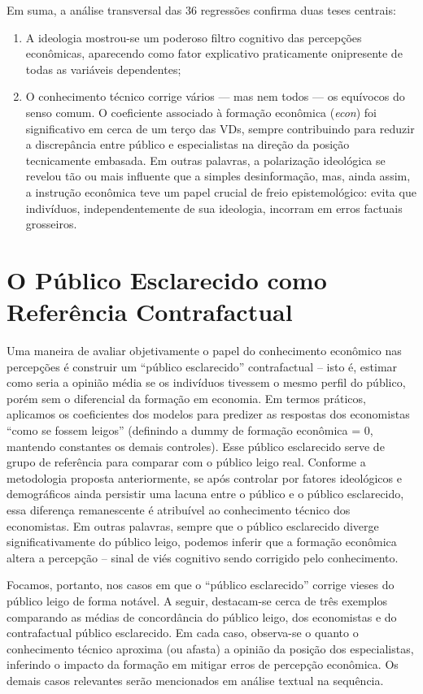 Em suma, a análise transversal das 36 regressões confirma duas teses centrais: 

\begin{enumerate}
    \item A ideologia mostrou-se um poderoso filtro cognitivo das percepções econômicas, aparecendo como fator explicativo praticamente onipresente de todas as variáveis dependentes;
    \item O conhecimento técnico corrige vários — mas nem todos — os equívocos do senso comum. O coeficiente associado à formação econômica (\emph{econ}) foi significativo em cerca de um terço das VDs, sempre contribuindo para reduzir a discrepância entre público e especialistas na direção da posição tecnicamente embasada. Em outras palavras, a polarização ideológica se revelou tão ou mais influente que a simples desinformação, mas, ainda assim, a instrução econômica teve um papel crucial de freio epistemológico: evita que indivíduos, independentemente de sua ideologia, incorram em erros factuais grosseiros.
\end{enumerate}

\section{O Público Esclarecido como Referência Contrafactual}

Uma maneira de avaliar objetivamente o papel do conhecimento econômico nas percepções é construir um “público esclarecido” contrafactual – isto é, estimar como seria a opinião média se os indivíduos tivessem o mesmo perfil do público, porém sem o diferencial da formação em economia. Em termos práticos, aplicamos os coeficientes dos modelos para predizer as respostas dos economistas “como se fossem leigos” (definindo a dummy de formação econômica = 0, mantendo constantes os demais controles). Esse público esclarecido serve de grupo de referência para comparar com o público leigo real. Conforme a metodologia proposta anteriormente, se após controlar por fatores ideológicos e demográficos ainda persistir uma lacuna entre o público e o público esclarecido, essa diferença remanescente é atribuível ao conhecimento técnico dos economistas. Em outras palavras, sempre que o público esclarecido diverge significativamente do público leigo, podemos inferir que a formação econômica altera a percepção – sinal de viés cognitivo sendo corrigido pelo conhecimento. 

Focamos, portanto, nos casos em que o “público esclarecido” corrige vieses do público leigo de forma notável. A seguir, destacam-se cerca de três exemplos comparando as médias de concordância do público leigo, dos economistas e do contrafactual público esclarecido. Em cada caso, observa-se o quanto o conhecimento técnico aproxima (ou afasta) a opinião da posição dos especialistas, inferindo o impacto da formação em mitigar erros de percepção econômica. Os demais casos relevantes serão mencionados em análise textual na sequência.

